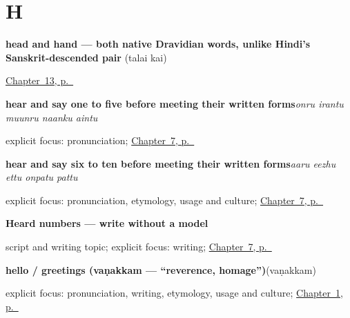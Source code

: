 \section*{H}

\noindent\begin{minipage}[t]{\linewidth}
\raggedright
\textbf{head and hand — both native Dravidian words, unlike Hindi's Sanskrit-descended pair}\enspace\emph{ }\enspace(talai kai)\par
\footnotesize \hyperref[ch:ta-body-parts]{Chapter~13, p.~\pageref*{ch:ta-body-parts}}
\end{minipage}\par\smallskip

\noindent\begin{minipage}[t]{\linewidth}
\raggedright
\textbf{hear and say one to five before meeting their written forms}\enspace\emph{onru irantu muunru naanku aintu}\par
\footnotesize explicit focus: pronunciation; \hyperref[ch:ta-numbers-one-to-ten]{Chapter~7, p.~\pageref*{ch:ta-numbers-one-to-ten}}
\end{minipage}\par\smallskip

\noindent\begin{minipage}[t]{\linewidth}
\raggedright
\textbf{hear and say six to ten before meeting their written forms}\enspace\emph{aaru eezhu ettu onpatu pattu}\par
\footnotesize explicit focus: pronunciation, etymology, usage and culture; \hyperref[ch:ta-numbers-one-to-ten]{Chapter~7, p.~\pageref*{ch:ta-numbers-one-to-ten}}
\end{minipage}\par\smallskip

\noindent\begin{minipage}[t]{\linewidth}
\raggedright
\textbf{Heard numbers — write without a model}\par
\footnotesize script and writing topic; explicit focus: writing; \hyperref[ch:ta-numbers-one-to-ten]{Chapter~7, p.~\pageref*{ch:ta-numbers-one-to-ten}}
\end{minipage}\par\smallskip

\noindent\begin{minipage}[t]{\linewidth}
\raggedright
\textbf{hello / greetings (vaṇakkam — \textquotedblleft{}reverence, homage\textquotedblright{})}\enspace\emph{}\enspace(vaṇakkam)\par
\footnotesize explicit focus: pronunciation, writing, etymology, usage and culture; \hyperref[ch:greetings]{Chapter~1, p.~\pageref*{ch:greetings}}
\end{minipage}\par\smallskip

